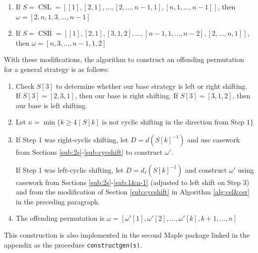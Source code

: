 \documentclass[article]{amsart}
\theoremstyle{plain}
\DeclareMathOperator{\CSL}{CSL}
\DeclareMathOperator{\CSR}{CSR}
\begin{document}
\begin{algorithm}[h!]
    \caption{Offending Permutation Constructor For $\CSL$ and $\CSR$} \label{alg:csl&csr}
    \begin{enumerate}
        \item If $S = \CSL =  [[1],[2,1], \dots, [2,\dots, n-1,1], [n,1,\dots, n-1]]$, then $\omega = [2,n,1,3,\dots,n-1]$
        \item If $S = \CSR = [[1],[2,1],[3,1,2],\dots,[n-1,1,\dots,n-2],[2,\dots,n,1]]$, then $\omega = [n,3,\dots,n-1,1,2]$
    \end{enumerate}
\end{algorithm}


With these modifications, the algorithm to construct an offending permutation for a general strategy is as follows:

\begin{algorithm}[h!]
\caption{Offending Permutation Constructor For a General Strategy $S$} \label{alg:GEN}
\begin{enumerate}
\item Check $S[3]$ to determine whether our base strategy is left or right shifting. If $S[3]=[2,3,1]$, then our base is right shifting. If $S[3]=[3,1,2]$, then our base is left shifting.

\item Let $\kappa = \min\{k \geq 4 \mid S[k] \text{ is not cyclic shifting in the direction from Step 1} \}$

\item If Step 1 was right-cyclic shifting, let $D = d(S[k]^{-1})$ and use casework from Sections \ref{sub:2s}-\ref{sub:cycshift} to construct $\omega'$. 

If Step 1 was left-cyclic shifting, let $D = d_\ell (S[k]^{-1})$ and construct $\omega'$ using casework from Sections \ref{sub:2s}-\ref{sub:1&n-1} (adjusted to left shift on Step 3) and from the modification of Section \ref{sub:cycshift} in Algorithm \ref{alg:csl&csr} in the preceding paragraph.

\item The offending permutation is $\omega = [\omega'[1], \omega'[2], \dots, \omega'[k], k+1, \dots, n] $ 
\end{enumerate}
\end{algorithm}

This construction is also implemented in the second Maple package linked in the appendix as the procedure \texttt{constructgen(s)}.
\end{document}
